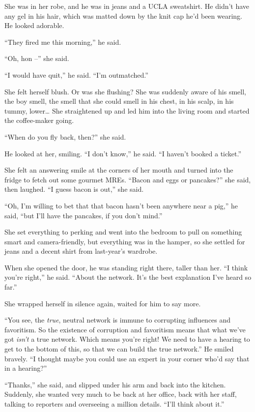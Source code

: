 She was in her robe, and he was in jeans and a UCLA sweatshirt. He 
didn't have any gel in his hair, which was matted down by the knit cap 
he'd been wearing. He looked adorable.

“They fired me this morning,” he said.

“Oh, hon --” she said.

“I would have quit,” he said. “I'm outmatched.”

She felt herself blush. Or was she flushing? She was suddenly aware of 
his smell, the boy smell, the smell that she could smell in his chest, 
in his scalp, in his tummy, lower\ldots{} She straightened up and led him 
into the living room and started the coffee-maker going.

“When do you fly back, then?” she said.

He looked at her, smiling. “I don't know,” he said. “I haven't 
booked a ticket.”

She felt an answering smile at the corners of her mouth and turned into 
the fridge to fetch out some gourmet MREs. “Bacon and eggs or 
pancakes?” she said, then laughed. “I guess bacon is out,” she 
said.

“Oh, I'm willing to bet that that bacon hasn't been anywhere near a 
pig,” he said, “but I'll have the pancakes, if you don't mind.”

She set everything to perking and went into the bedroom to pull on 
something smart and camera-friendly, but everything was in the hamper, 
so she settled for jeans and a decent shirt from last-year's wardrobe.

When she opened the door, he was standing right there, taller than her. 
“I think you're right,” he said. “About the network. It's the 
best explanation I've heard so far.”

She wrapped herself in silence again, waited for him to say more.

“You see, the \emph{true}, neutral network is immune to corrupting 
influences and favoritism. So the existence of corruption and 
favoritism means that what we've got \emph{isn't} a true network. Which 
means you're right! We need to have a hearing to get to the bottom of 
this, so that we can build the true network.” He smiled bravely. “I 
thought maybe you could use an expert in your corner who'd say that in 
a hearing?”

“Thanks,” she said, and slipped under his arm and back into the 
kitchen. Suddenly, she wanted very much to be back at her office, back 
with her staff, talking to reporters and overseeing a million details. 
“I'll think about it.”

